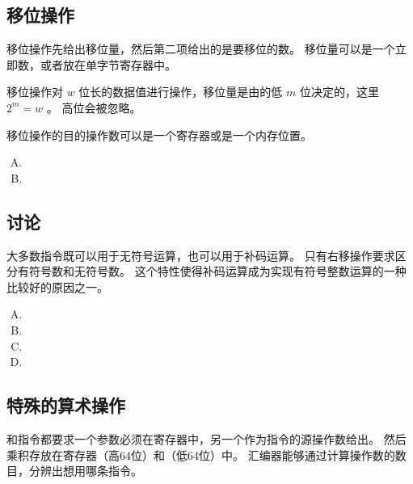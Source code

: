 {    \subsection{移位操作}
    {
        移位操作先给出移位量，然后第二项给出的是要移位的数。
        移位量可以是一个立即数，或者放在单字节寄存器中。

        移位操作对 $w$ 位长的数据值进行操作，移位量是由的低 $m$ 位决定的，这里 $2^m = w$ 。
        高位会被忽略。

        移位操作的目的操作数可以是一个寄存器或是一个内存位置。

        \begin{practicec}
            \begin{enumerate}[A.]
                \item {}
                \item {}
            \end{enumerate}
        \end{practicec}
    }

    \subsection{讨论}
    {
        大多数指令既可以用于无符号运算，也可以用于补码运算。
        只有右移操作要求区分有符号数和无符号数。
        这个特性使得补码运算成为实现有符号整数运算的一种比较好的原因之一。

        \begin{practicec}
            \begin{enumerate}[A.]
                \item {}
                \item {}
                \item {}
                \item {}
            \end{enumerate}
        \end{practicec}

        \begin{practicec}
        \end{practicec}
    }

    \subsection{特殊的算术操作}
    {
        和指令都要求一个参数必须在寄存器中，另一个作为指令的源操作数给出。
        然后乘积存放在寄存器（高64位）和（低64位）中。
        汇编器能够通过计算操作数的数目，分辨出想用哪条指令。

}}
